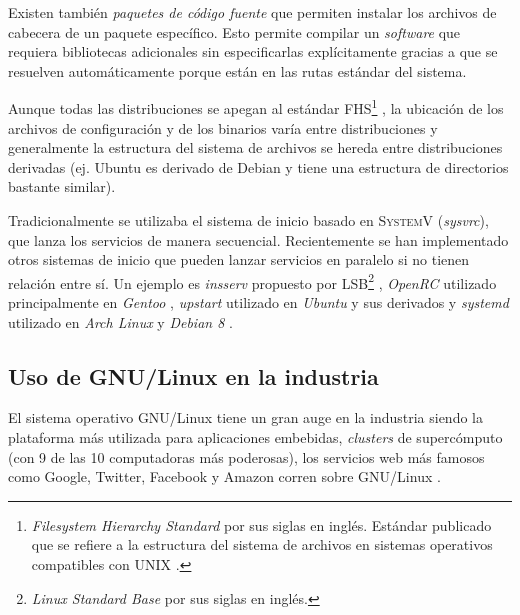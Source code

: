 Existen tambi\'{e}n \textit{paquetes de c\'{o}digo fuente} que permiten instalar los archivos de cabecera de un paquete espec\'{i}fico. Esto permite compilar un \textit{software} que requiera bibliotecas adicionales sin especificarlas expl\'{i}citamente gracias a que se resuelven autom\'{a}ticamente porque est\'{a}n en las rutas est\'{a}ndar del sistema.

Aunque todas las distribuciones se apegan al est\'{a}ndar \textsc{FHS}\footnote{\textit{Filesystem Hierarchy Standard} por sus siglas en ingl\'{e}s. Est\'{a}ndar publicado que se refiere a la estructura del sistema de archivos en sistemas operativos compatibles con \textsc{UNIX} \cite{_fhs_????}.} \cite{_filesystem_????}, la ubicaci\'{o}n de los archivos de configuraci\'{o}n y de los binarios var\'{i}a entre distribuciones y generalmente la estructura del sistema de archivos se hereda entre distribuciones derivadas (ej. Ubuntu es derivado de Debian y tiene una estructura de directorios bastante similar).

Tradicionalmente se utilizaba el sistema de inicio basado en \textsc{SystemV} (\textit{sysvrc}), que lanza los servicios de manera secuencial. Recientemente se han implementado otros sistemas de inicio que pueden lanzar servicios en paralelo si no tienen relaci\'{o}n entre s\'{i}. Un ejemplo es \textit{insserv} propuesto por \textsc{LSB}\footnote{\textit{Linux Standard Base} por sus siglas en ingl\'{e}s.} \cite{_lsbinitscripts_????} \cite{_lsbinitscripts/dependencybasedboot_????}, \textit{OpenRC} utilizado principalmente en \textit{Gentoo} \cite{_gentoo_????}\cite{_openrc_????}\cite{_openrc_????-1}, \textit{upstart} utilizado en \textit{Ubuntu} y sus derivados \cite{_upstart_????} y \textit{systemd} utilizado en \textit{Arch Linux} y \textit{Debian 8} \cite{_systemd_????}.


  \subsection {Uso de GNU/Linux en la industria}

El sistema operativo GNU/Linux tiene un gran auge en la industria siendo la plataforma m\'{a}s utilizada para aplicaciones embebidas, \textit{clusters} de superc\'{o}mputo (con 9 de las 10 computadoras m\'{a}s poderosas), los servicios web m\'{a}s famosos como Google, Twitter, Facebook y Amazon corren sobre GNU/Linux \cite{_how_????}.
\newpage

